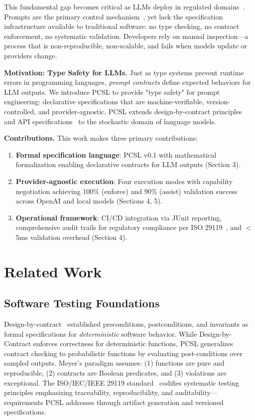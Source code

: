\documentclass[sigconf]{acmart}
\begin{document}
This fundamental gap becomes critical as LLMs deploy in regulated domains~\cite{euaiact2024}. Prompts are the primary control mechanism~\cite{wei2022chain, brown2020language}, yet lack the specification infrastructure available to traditional software: no type checking, no contract enforcement, no systematic validation. Developers rely on manual inspection—a process that is non-reproducible, non-scalable, and fails when models update or providers change.

\textbf{Motivation: Type Safety for LLMs.} Just as type systems prevent runtime errors in programming languages, \textit{prompt contracts} define expected behaviors for LLM outputs. We introduce PCSL to provide "type safety" for prompt engineering: declarative specifications that are machine-verifiable, version-controlled, and provider-agnostic. PCSL extends design-by-contract principles~\cite{meyer1992applying} and API specifications~\cite{openapi2017} to the stochastic domain of language models.

\textbf{Contributions.} This work makes three primary contributions:
\begin{enumerate}
\item \textbf{Formal specification language}: PCSL v0.1 with mathematical formalization enabling declarative contracts for LLM outputs (Section 3).
\item \textbf{Provider-agnostic execution}: Four execution modes with capability negotiation achieving 100\% (enforce) and 90\% (assist) validation success across OpenAI and local models (Sections 4, 5).
\item \textbf{Operational framework}: CI/CD integration via JUnit reporting, comprehensive audit trails for regulatory compliance per ISO 29119~\cite{iso29119}, and \(<\)5ms validation overhead (Section 4).
\end{enumerate}

\section{Related Work}

\subsection{Software Testing Foundations}

Design-by-contract~\cite{meyer1992applying} established preconditions, postconditions, and invariants as formal specifications for \textit{deterministic} software behavior. While Design-by-Contract enforces correctness for deterministic functions, PCSL generalizes contract checking to probabilistic functions by evaluating post-conditions over sampled outputs. Meyer's paradigm assumes: (1) functions are pure and reproducible, (2) contracts are Boolean predicates, and (3) violations are exceptional. The ISO/IEC/IEEE 29119 standard~\cite{iso29119} codifies systematic testing principles emphasizing traceability, reproducibility, and auditability—requirements PCSL addresses through artifact generation and versioned specifications.
\end{document}
